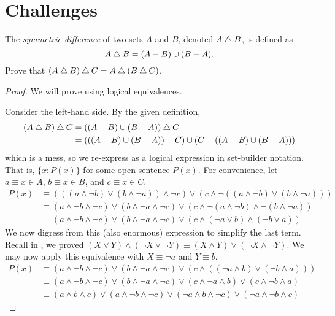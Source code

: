 \section{Challenges}
\begin{challenge}
  The \emph{symmetric difference} of two sets $A$ and $B$, denoted $A \mathbin{\triangle} B$, is defined as
  \[ A \mathbin{\triangle} B = (A-B) \cup (B-A). \]
  Prove that $(A \mathbin{\triangle} B) \mathbin{\triangle} C = A \mathbin{\triangle} (B \mathbin{\triangle} C)$.
\end{challenge}
\begin{proof}
  We will prove using logical equivalences.

  Consider the left-hand side. By the given definition,
  \begin{align*}
    (A \mathbin{\triangle} B) \mathbin{\triangle} C & = ((A-B) \cup (B-A)) \mathbin{\triangle} C                              \\
                      & = (((A-B) \cup (B-A)) - C) \cup (C - ((A-B) \cup (B-A)))
  \end{align*}
  which is a mess, so we re-express as a logical expression in set-builder notation.
  That is, $\{ x : P(x) \}$ for some open sentence $P(x)$.
  For convenience, let $a \equiv x\in A$, $b \equiv x\in B$, and $c \equiv x\in C$.
  \begin{align*}
    P(x)
     & \equiv (((a \land \lnot b) \lor (b \land \lnot a)) \land \lnot c)
    \lor (c \land \lnot((a \land \lnot b) \lor (b \land \lnot a)))                 \\
     & \equiv (a \land \lnot b \land \lnot c) \lor (b \land \lnot a \land \lnot c)
    \lor (c \land \lnot(a \land \lnot b) \land \lnot(b \land \lnot a))             \\
     & \equiv (a \land \lnot b \land \lnot c) \lor (b \land \lnot a \land \lnot c)
    \lor (c \land (\lnot a \lor b) \land (\lnot b \lor a))
  \end{align*}
  We now digress from this (also enormous) expression to simplify the last term.
  Recall in , we proved
  $(X \lor Y) \land (\lnot X \lor \lnot Y) \equiv (X \land Y) \lor (\lnot X \land \lnot Y)$.
  We may now apply this equivalence with $X\equiv\lnot a$ and $Y\equiv b$.
  \begin{align*}
    P(x)
     & \equiv (a \land \lnot b \land \lnot c) \lor (b \land \lnot a \land \lnot c)
    \lor (c \land ((\lnot a \land b) \lor (\lnot b \land a)))                      \\
     & \equiv (a \land \lnot b \land \lnot c) \lor (b \land \lnot a \land \lnot c)
    \lor (c \land \lnot a \land b) \lor (c \land \lnot b \land a)                  \\
     & \equiv (a \land b \land c) \lor (a \land \lnot b \land \lnot c)
    \lor (\lnot a \land b \land \lnot c) \lor (\lnot a \land \lnot b \land c)
  \end{align*}


\end{proof}
